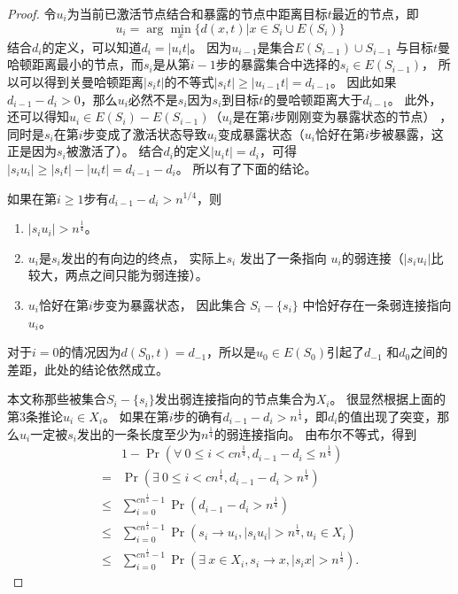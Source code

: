 \begin{proof}
令$u_{i}$为当前已激活节点结合和暴露的节点中距离目标$t$最近的节点，即
$$u_{i} = \arg\min_x \{ d(x,t) | x\in S_i \cup E(S_{i}) \}$$
结合$d_i$的定义，可以知道$d_i = |u_{i}t|$。
因为$u_{i-1}$是集合$E(S_{i-1}) \cup S_{i-1}$ 与目标$t$曼哈顿距离最小的节点，而$s_i$是从第$i-1$步的暴露集合中选择的$s_i \in E(S_{i-1})$，
所以可以得到关曼哈顿距离$|s_{i}t|$的不等式$|s_{i}t| \geq |u_{i-1}t| = d_{i-1}$。
因此如果$d_{i-1}-d_{i}> 0$，那么$u_{i}$必然不是$s_i$因为$s_i$到目标$t$的曼哈顿距离大于$d_{i-1}$。
此外，还可以得知$u_i \in E(S_i) - E(S_{i-1})$（$u_i$是在第$i$步刚刚变为暴露状态的节点）
，同时是$s_i$在第$i$步变成了激活状态导致$u_i$变成暴露状态（$u_i$恰好在第$i$步被暴露，这正是因为$s_i$被激活了）。
结合$d_i$的定义$|u_{i}t| = d_{i}$，可得$|s_{i}u_{i}| \geq |s_{i}t| - |u_{i}t| = d_{i-1}-d_{i}$。
所以有了下面的结论。

如果在第$i \geq 1$步有$d_{i-1}-d_{i}> n^{1/4}$，则
\vspace{0.2cm}
\begin{enumerate} 
\item $|s_{i}u_{i}| > n^{\frac{1}{4}}$。
\item $u_i$是$s_i$发出的有向边的终点， 实际上$s_i$ 发出了一条指向 $u_i$的弱连接（$|s_{i}u_{i}|$比较大，两点之间只能为弱连接）。
\item $u_i$恰好在第$i$步变为暴露状态， 因此集合 $S_{i} - \{s_i\}$ 中恰好存在一条弱连接指向 $u_i$。
\end{enumerate}
对于$i=0$的情况因为$d(S_0,t) = d_{-1}$，所以是$u_0 \in E(S_0)$引起了$d_{-1}$ 和$d_0$之间的差距，此处的结论依然成立。

本文称那些被集合$S_{i} - \{s_i\}$发出弱连接指向的节点集合为$X_i$。
很显然根据上面的第3条推论$u_i \in X_i$。
如果在第$i$步的确有$d_{i-1}-d_{i}> n^{\frac{1}{4}}$，即$d_i$的值出现了突变，那么$u_i$一定被$s_i$发出的一条长度至少为$n^{\frac{1}{4}}$的弱连接指向。
由布尔不等式，得到
\begin{equation}
\begin{array}{ll}
& 1- \Pr(\forall~0 \leq i < cn^{\frac{1}{4}}, d_{i-1}-d_{i}\leq n^{\frac{1}{4}})\\
= & \Pr(\exists~0 \leq i < cn^{\frac{1}{4}}, d_{i-1}-d_{i}> n^{\frac{1}{4}}) \\
\leq & \sum_{i=0}^{cn^{\frac{1}{4}}-1}\Pr(d_{i-1}-d_{i}> n^{\frac{1}{4}}) \\
\leq & \sum_{i=0}^{cn^{\frac{1}{4}}-1}\Pr(s_i \to u_i , |s_iu_i| > n^{\frac{1}{4}} , u_i \in X_i) \\
\leq & \sum_{i=0}^{cn^{\frac{1}{4}}-1}\Pr(\exists~x \in X_i, s_i \to x, |s_ix| > n^{\frac{1}{4}}).
\end{array}
\label{eq:routing}
\end{equation}


\end{proof}
